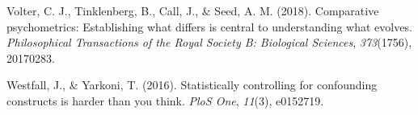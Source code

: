 \documentclass[10pt, letterpaper]{article}
\begin{document}
\leavevmode\hypertarget{ref-volter2018comparative}{}%
Volter, C. J., Tinklenberg, B., Call, J., \& Seed, A. M. (2018).
Comparative psychometrics: Establishing what differs is central to
understanding what evolves. \emph{Philosophical Transactions of the
Royal Society B: Biological Sciences}, \emph{373}(1756), 20170283.

\leavevmode\hypertarget{ref-westfall2016statistically}{}%
Westfall, J., \& Yarkoni, T. (2016). Statistically controlling for
confounding constructs is harder than you think. \emph{PloS One},
\emph{11}(3), e0152719.


\end{document}
